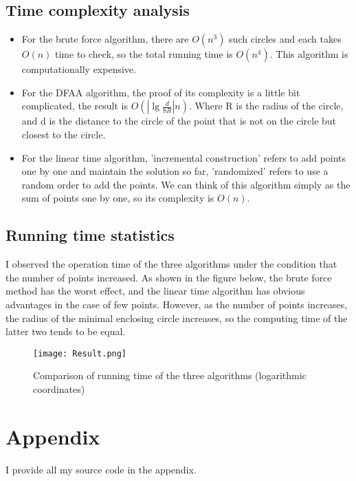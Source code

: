 \documentclass[a4paper, 12pt]{article}
\begin{document}
\subsection{Time complexity analysis}
\begin{itemize}
\item For the brute force algorithm, there are $O(n^3)$ such circles and each takes $O(n)$ time to check, so the total running time is $O(n^4)$. This algorithm is computationally expensive.
\item For the DFAA algorithm, the proof of its complexity is a little bit complicated, the result is $O(\left|\lg{\frac{d}{8R}}\right|n)$. Where R is the radius of the circle, and d is the distance to the circle of the point that is not on the circle but closest to the circle.
\item For the linear time algorithm, 'incremental construction' refers to add points one by one and maintain the solution so far, 'randomized' refers to use a random order to add the points. We can think of this algorithm simply as the sum of points one by one, so its complexity is $O(n)$.
\end{itemize}

\subsection{Running time statistics}

I observed the operation time of the three algorithms under the condition that the number of points increased. As shown in the figure below, the brute force method has the worst effect, and the linear time algorithm has obvious advantages in the case of few points. However, as the number of points increases, the radius of the minimal enclosing circle increases, so the computing time of the latter two tends to be equal.
\begin{figure}[H]
	\centering 
	\texttt{[image: Result.png]} 
	\caption{Comparison of running time of the three algorithms (logarithmic coordinates)} 
	\label{fig:Result}  
\end{figure}

\newpage
\appendix
\section{Appendix}
%
I provide all my source code in the appendix.
\end{document}
